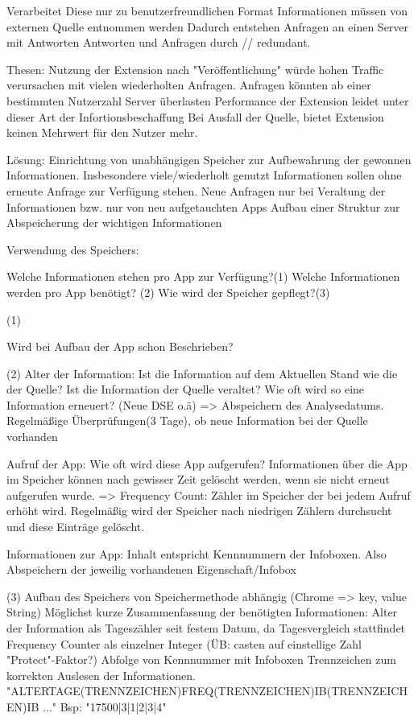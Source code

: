 Verarbeitet Diese nur zu benutzerfreundlichen Format
Informationen müssen von externen Quelle entnommen werden
Dadurch entstehen Anfragen an einen Server mit Antworten
Antworten und Anfragen durch // redundant.

Thesen:
Nutzung der Extension nach "Veröffentlichung" würde hohen Traffic verursachen mit vielen wiederholten Anfragen.
Anfragen könnten ab einer bestimmten Nutzerzahl Server überlasten
Performance der Extension leidet unter dieser Art der Infortionsbeschaffung
Bei Ausfall der Quelle, bietet Extension keinen Mehrwert für den Nutzer mehr.

Lösung:
Einrichtung von unabhängigen Speicher zur Aufbewahrung der gewonnen Informationen. Insbesondere viele/wiederholt genutzt Informationen sollen ohne erneute Anfrage zur Verfügung stehen.
Neue Anfragen nur bei Veraltung der Informationen bzw. nur von neu aufgetauchten Apps
Aufbau einer Struktur zur Abspeicherung der wichtigen Informationen


Verwendung des Speichers:

Welche Informationen stehen pro App zur Verfügung?(1)
Welche Informationen werden pro App benötigt? (2)
Wie wird der Speicher gepflegt?(3)

(1)

Wird bei Aufbau der App schon Beschrieben?


(2)
Alter der Information:
Ist die Information auf dem Aktuellen Stand wie die der Quelle?
Ist die Information der Quelle veraltet?
Wie oft wird so eine Information erneuert? (Neue DSE o.ä)
=> Abspeichern des Analysedatums. Regelmäßige Überprüfungen(3 Tage), ob neue Information bei der Quelle vorhanden

Aufruf der App:
Wie oft wird diese App aufgerufen?
Informationen über die App im Speicher können nach gewisser Zeit gelöscht werden, wenn sie nicht erneut aufgerufen wurde.
=> Frequency Count: Zähler im Speicher der bei jedem Aufruf erhöht wird. Regelmäßig wird der Speicher nach niedrigen Zählern durchsucht und diese Einträge gelöscht.

Informationen zur App:
Inhalt entspricht Kennnummern der Infoboxen. Also Abspeichern der jeweilig vorhandenen Eigenschaft/Infobox
 
(3)
Aufbau des Speichers von Speichermethode abhängig (Chrome => key, value String)
Möglichst kurze Zusammenfassung der benötigten Informationen:
Alter der Information als Tageszähler seit festem Datum, da Tagesvergleich stattfindet
Frequency Counter als einzelner Integer (ÜB: casten auf einstellige Zahl "Protect"-Faktor?)
Abfolge von Kennnummer mit Infoboxen
Trennzeichen zum korrekten Auslesen der Informationen.
"ALTERTAGE(TRENNZEICHEN)FREQ(TRENNZEICHEN)IB(TRENNZEICHEN)IB ..."
Bsp: "17500|3|1|2|3|4"

